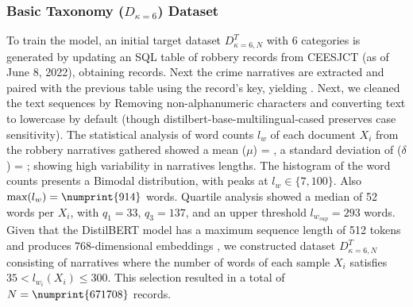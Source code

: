 \documentclass[runningheads]{llncs}
\newcommand{\printInicialesComision}{CEESJCT}
\newcommand{\modelohuggingface}{distilbert-base-multilingual-cased}
\begin{document}
\subsubsection{Basic Taxonomy (\(D_{\kappa=6}\)) Dataset}
\label{initial-crime-dataset}
To train the model, an initial target dataset \(D^T_{\kappa=6, N}\)
with 6 categories is generated by updating an SQL table of robbery
records from \printInicialesComision{} (as of June 8, 2022), obtaining
 records. Next the crime narratives are extracted and
paired with the previous table using the record's key, yielding
. Next, we cleaned the text sequences by Removing
non-alphanumeric characters and converting text to lowercase by
default (though \modelohuggingface{} preserves case sensitivity). The
statistical analysis of word counts \(l_w\) of each document \(X_i\)
from the robbery narratives gathered showed a mean ($\mu$) =
, a standard deviation of ($\delta$) =
; showing high variability in narratives lengths. The
histogram of the word counts presents a Bimodal distribution, with
peaks at $l_w \in \{7, 100\}$. Also $\text{max}(l_w)=\numprint{914}$
words. Quartile analysis showed a median of 52 words per $X_i$, with
$q_1=33$, $q_3=137$, and an upper threshold $l_{w_{sup}} = 293$
words. Given that the DistilBERT model has a maximum sequence length
of 512 tokens and produces 768-dimensional embeddings
\cite{Sanh2019DistilBERTAD}, we constructed dataset
$D^T_{\kappa=6, N}$ consisting of narratives where the number of words
of each sample $X_i$ satisfies $35 < l_{w_i}(X_i) \leq 300$. This
selection resulted in a total of $N = \numprint{671708}$
records. %

\end{document}
